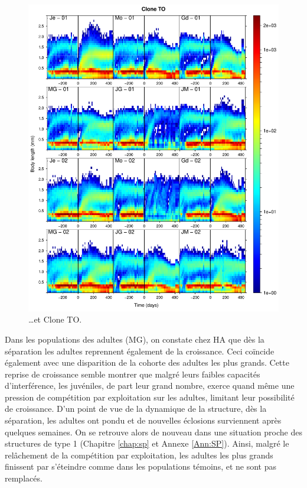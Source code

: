 {{\begin{figure}[p]
		\includegraphics[width=\textwidth]{1_CorpsDeThese/Resumes/Fig/SM03b}
        \caption*{\ldots et Clone TO.}
    \end{figure}
    \clearpage
    }%
}



Dans les populations des adultes (MG), on constate chez HA que dès la
séparation les adultes reprennent également de la croissance. Ceci coïncide
également avec une disparition de la cohorte des adultes les plus grands. Cette
reprise de croissance semble montrer que malgré leurs faibles capacités
d'interférence, les juvéniles, de part leur grand nombre, exerce quand même une
pression de compétition par exploitation sur les adultes, limitant leur
possibilité de croissance. D'un point de vue de la dynamique de la structure,
dès la séparation, les adultes ont pondu et de nouvelles éclosions surviennent
après quelques semaines. On se retrouve alors de nouveau dans une situation
proche des structures de type 1 (Chapitre \ref{chap:sp} et Annexe \ref{Ann:SP}).
Ainsi, malgré le relâchement de la compétition par exploitation, les adultes les plus grands finissent par s'éteindre comme
dans les populations témoins, et ne sont pas remplacés. 

